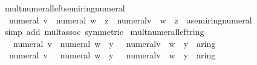\begin{isabellebody}
\endisatagproof
{\isafoldproof}%
%
\isadelimproof
\isanewline
%
\endisadelimproof
\isanewline
{}\isamarkupfalse%
\ mult{\isacharunderscore}{\kern0pt}numeral{\isacharunderscore}{\kern0pt}left{\isacharunderscore}{\kern0pt}semiring{\isacharunderscore}{\kern0pt}numeral{\isacharcolon}{\kern0pt}\isanewline
\ \ {\isachardoublequoteopen}numeral\ v\ {\isacharasterisk}{\kern0pt}\ {\isacharparenleft}{\kern0pt}numeral\ w\ {\isacharasterisk}{\kern0pt}\ z{\isacharparenright}{\kern0pt}\ {\isacharequal}{\kern0pt}\ {\isacharparenleft}{\kern0pt}numeral{\isacharparenleft}{\kern0pt}v\ {\isacharasterisk}{\kern0pt}\ w{\isacharparenright}{\kern0pt}\ {\isacharasterisk}{\kern0pt}\ z\ {\isacharcolon}{\kern0pt}{\isacharcolon}{\kern0pt}\ {\isacharprime}{\kern0pt}a{\isacharcolon}{\kern0pt}{\isacharcolon}{\kern0pt}semiring{\isacharunderscore}{\kern0pt}numeral{\isacharparenright}{\kern0pt}{\isachardoublequoteclose}\isanewline
%
\isadelimproof
\ \ %
\endisadelimproof
%
\isatagproof
{}\isamarkupfalse%
\ {\isacharparenleft}{\kern0pt}simp\ add{\isacharcolon}{\kern0pt}\ mult{\isachardot}{\kern0pt}assoc\ {\isacharbrackleft}{\kern0pt}symmetric{\isacharbrackright}{\kern0pt}{\isacharparenright}{\kern0pt}%
\endisatagproof
{\isafoldproof}%
%
\isadelimproof
\isanewline
%
\endisadelimproof
\isanewline
{}\isamarkupfalse%
\ mult{\isacharunderscore}{\kern0pt}numeral{\isacharunderscore}{\kern0pt}left{\isacharunderscore}{\kern0pt}ring{\isacharunderscore}{\kern0pt}{}{\isacharcolon}{\kern0pt}\isanewline
\ \ {\isachardoublequoteopen}{\isacharminus}{\kern0pt}\ numeral\ v\ {\isacharasterisk}{\kern0pt}\ {\isacharparenleft}{\kern0pt}numeral\ w\ {\isacharasterisk}{\kern0pt}\ y{\isacharparenright}{\kern0pt}\ {\isacharequal}{\kern0pt}\ {\isacharparenleft}{\kern0pt}{\isacharminus}{\kern0pt}\ numeral{\isacharparenleft}{\kern0pt}v\ {\isacharasterisk}{\kern0pt}\ w{\isacharparenright}{\kern0pt}\ {\isacharasterisk}{\kern0pt}\ y\ {\isacharcolon}{\kern0pt}{\isacharcolon}{\kern0pt}\ {\isacharprime}{\kern0pt}a{\isacharcolon}{\kern0pt}{\isacharcolon}{\kern0pt}ring{\isacharunderscore}{\kern0pt}{}{\isacharparenright}{\kern0pt}{\isachardoublequoteclose}\isanewline
\ \ {\isachardoublequoteopen}numeral\ v\ {\isacharasterisk}{\kern0pt}\ {\isacharparenleft}{\kern0pt}{\isacharminus}{\kern0pt}\ numeral\ w\ {\isacharasterisk}{\kern0pt}\ y{\isacharparenright}{\kern0pt}\ {\isacharequal}{\kern0pt}\ {\isacharparenleft}{\kern0pt}{\isacharminus}{\kern0pt}\ numeral{\isacharparenleft}{\kern0pt}v\ {\isacharasterisk}{\kern0pt}\ w{\isacharparenright}{\kern0pt}\ {\isacharasterisk}{\kern0pt}\ y\ {\isacharcolon}{\kern0pt}{\isacharcolon}{\kern0pt}\ {\isacharprime}{\kern0pt}a{\isacharcolon}{\kern0pt}{\isacharcolon}{\kern0pt}ring{\isacharunderscore}{\kern0pt}{}{\isacharparenright}{\kern0pt}{\isachardoublequoteclose}\isanewline

\end{isabellebody}
